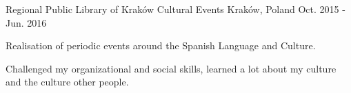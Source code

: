 \begin{cventries}
\cventry
    {Regional Public Library of Kraków} %
    {Cultural Events} %
    {Kraków, Poland} %
    {Oct. 2015 - Jun. 2016} %
    {
        \begin{cvitems} %
            \item {Realisation of periodic events around the Spanish Language and Culture.}
            \item {Challenged my organizational and social skills, learned a lot about my culture and the culture other people.}
        \end{cvitems}
    }

\end{cventries}
